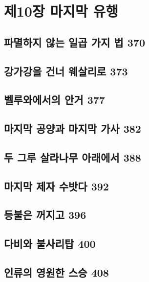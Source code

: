 \documentclass[12pt, a4paper, oneside]{book}
\let\stdsection\section
\renewcommand\section{\newpage\stdsection}
\begin{document}
	\chapter{제10장 마지막 유행}
	\noptcrule
	\parttoc				


	\section{파멸하지 않는 일곱 가지 법 370 }

	\section{강가강을 건너 웨살리로 373 }

	\section{벨루와에서의 안거 377 }

	\section{마지막 공양과 마지막 가사 382 }

	\section{두 그루 살라나무 아래에서 388 }

	\section{마지막 제자 수밧다 392 }

	\section{등불은 꺼지고 396 }

	\section{다비와 불사리탑 400 }

	\section{인류의 영원한 스승 408}


\end{document}
